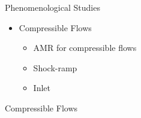 \documentclass[landscape,pdftex,headrule,footrule]{foils}
\begin{document}
\begin{foil}{Phenomenological Studies}
  \begin{itemize}
    \item Compressible Flows
      \begin{itemize}
	\item AMR for compressible flows
	\item Shock-ramp
	\item Inlet
      \end{itemize}
  \end{itemize}
\end{foil}  



\begin{foil}[-.25in]{Compressible Flows}
\end{foil}
\end{document}

